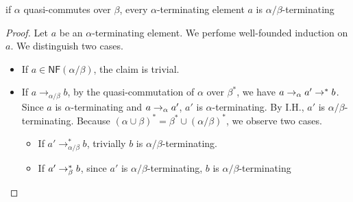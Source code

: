 \documentclass[12pt,aspectratio=169]{beamer}
\begin{document}
\newcommand{\abto}{\to_{\alpha/\beta}}

\begin{frame}
    \frametitle{}
    \begin{lemma}
        if $\alpha$ quasi-commutes over $\beta$,
        every $\alpha$-terminating element $a$ is $\alpha/\beta$-terminating
    \end{lemma}

    \begin{proof}
        Let $a$ be an $\alpha$-terminating element.
        We perfome well-founded induction on $a$.
        We distinguish two cases.
        \begin{itemize}
            \item If $a \in \mathsf{NF}(\alpha/\beta)$, the claim is trivial.
            \item If $a \abto b$, by the quasi-commutation of $\alpha$ over $\beta^*$, we have
            $a \to_{\alpha} a' \to^* b$. Since $a$ is $\alpha$-terminating and $a \to_{\alpha} a'$,
            $a'$ is $\alpha$-terminating. By I.H., $a'$ is $\alpha/\beta$-terminating.
            Because $(\alpha \cup \beta)^* = \beta^* \cup (\alpha/\beta)^*$,
            we observe two cases.
            \begin{itemize}
                \item If $a' \abto^* b$, trivially $b$ is $\alpha/\beta$-terminating.
                \item If $a' \to_{\beta}^* b$, since $a'$ is $\alpha/\beta$-terminating, $b$ is $\alpha/\beta$-terminating 
            \end{itemize}
        \end{itemize}

    \end{proof}

\end{frame}
\end{document}
